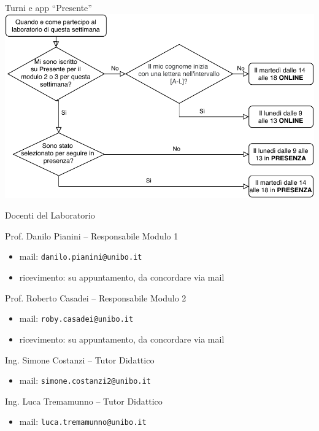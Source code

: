 \documentclass[presentation]{beamer}
\begin{document}
\begin{frame}{Turni e app ``Presente''}
    \includegraphics[width=\textwidth]{img/covid-presente}
\end{frame}

\begin{frame}{Docenti del Laboratorio}
    \begin{block}{Prof. Danilo Pianini -- Responsabile Modulo 1}
        \begin{itemize}
            \item mail: \texttt{danilo.pianini@unibo.it}
            \item ricevimento: su appuntamento, da concordare via mail
        \end{itemize}
    \end{block}
    \begin{block}{Prof. Roberto Casadei -- Responsabile Modulo 2}
        \begin{itemize}
            \item mail: \texttt{roby.casadei@unibo.it}
            \item ricevimento: su appuntamento, da concordare via mail
        \end{itemize}
    \end{block}
    \begin{block}{Ing. Simone Costanzi -- Tutor Didattico}
        \begin{itemize}
            \item mail: \texttt{simone.costanzi2@unibo.it}
        \end{itemize}
    \end{block}
    \begin{block}{Ing. Luca Tremamunno -- Tutor Didattico}
        \begin{itemize}
            \item mail: \texttt{luca.tremamunno@unibo.it}
        \end{itemize}
    \end{block}
\end{frame}
\end{document}
